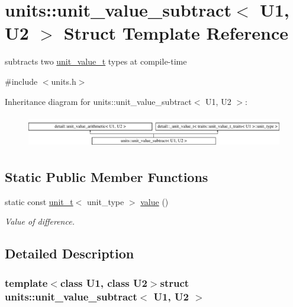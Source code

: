 \hypertarget{structunits_1_1unit__value__subtract}{}\section{units\+:\+:unit\+\_\+value\+\_\+subtract$<$ U1, U2 $>$ Struct Template Reference}
\label{structunits_1_1unit__value__subtract}


subtracts two \hyperlink{structunits_1_1unit__value__t}{unit\+\_\+value\+\_\+t} types at compile-\/time  




{\ttfamily \#include $<$units.\+h$>$}

Inheritance diagram for units\+:\+:unit\+\_\+value\+\_\+subtract$<$ U1, U2 $>$\+:\begin{figure}[H]
\begin{center}
\leavevmode
\includegraphics[height=1.450777cm]{structunits_1_1unit__value__subtract}
\end{center}
\end{figure}
\subsection*{Static Public Member Functions}
\begin{DoxyCompactItemize}
\item 
static const \hyperlink{classunits_1_1unit__t}{unit\+\_\+t}$<$ unit\+\_\+type $>$ \hyperlink{structunits_1_1unit__value__subtract_abee3d3276f3fc2ee6100a8b3bcba46fe}{value} ()
\begin{DoxyCompactList}\small\item\em Value of difference. \end{DoxyCompactList}\end{DoxyCompactItemize}


\subsection{Detailed Description}
\subsubsection*{template$<$class U1, class U2$>$struct units\+::unit\+\_\+value\+\_\+subtract$<$ U1, U2 $>$}

